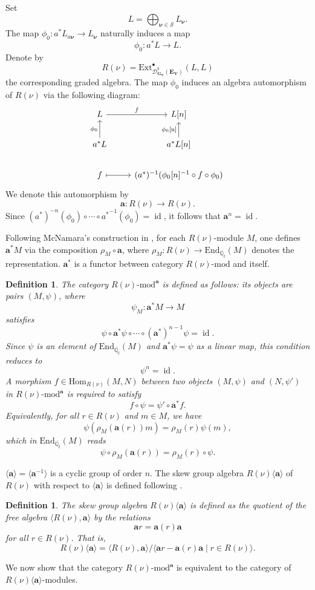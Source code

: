 \documentclass[10pt,a4paper]{amsart}
\newtheorem{definition}[theorem]{Definition}
\newcommand\bbq{{\mathbb Q}}
\begin{document}
Set
\[
L = \bigoplus_{\boldsymbol{\nu}\in \mathcal{S}} L_{\boldsymbol{\nu}}.
\]
The map $\phi_0 : a^* L_{a\boldsymbol{\nu}} \to L_{\boldsymbol{\nu}}$ naturally induces a map
\[
\phi_0 : a^* L \to L.
\]
Denote by
\[
R(\nu) = \mathrm{Ext}^{\bullet}_{\mathcal{D}^{b}_{\mathbf{G}_{\mathbf{V}}}(\mathbf{E}_{\mathbf{V}})}(L, L)
\]
the corresponding graded algebra. The map $\phi_0$ induces an algebra automorphism of $R(\nu)$ via the following diagram:
\[
\begin{tikzcd}
L \arrow[r, "f"] & L[n] \\
a^* L \arrow[u, "\phi_0"] & a^* L[n] \arrow[u, "\phi_0\text{[n]}"] \\
f \arrow[r, maps to] & (a^*)^{-1}(\phi_0[n]^{-1} \circ f \circ \phi_0)
\end{tikzcd}
\]
We denote this automorphism by
\[
\mathbf{a} : R(\nu) \to R(\nu).
\]
Since $(a^*)^{-n}(\phi_0) \circ \cdots \circ {a^*}^{-1}(\phi_0) = \operatorname{id}$, it follows that $\mathbf{a}^n = \operatorname{id}$.

Following McNamara's construction in \cite{https://doi.org/10.1112/jlms.12218}, for each $R(\nu)$-module $M$, one defines
$
\mathbf{a}^* M
$
via the composition $\rho_M \circ \mathbf{a}$, where $\rho_M : R(\nu) \to \mathrm{End}_{\overline{\bbq_l}}(M)$ denotes the representation. $\mathbf{a}^*$ is a functor between category $R(\nu)\text{-}\mathrm{mod}$ and itself. 
\begin{definition}
    The category $R(\nu)\text{-}\mathrm{mod}^\mathbf{a}$ is defined as follows: its objects are pairs $(M, \psi)$, where
\[
\psi_M : \mathbf{a}^* M \to M
\]
satisfies
\[
 \psi \circ \mathbf{a}^* \psi \circ \cdots \circ (\mathbf{a}^*)^{n-1} \psi= \operatorname{id}.
\]
Since $\psi$ is an element of $\mathrm{End}_{\overline{\bbq_l}}(M)$ and $\mathbf{a}^* \psi = \psi$ as a linear map, this condition reduces to
\[
\psi^n = \operatorname{id}.
\]
A morphism $f \in \mathrm{Hom}_{R(\nu)}(M, N)$ between two objects $(M, \psi)$ and $(N, \psi')$ in $R(\nu)\text{-}\mathrm{mod}^\mathbf{a}$ is required to satisfy
\[
f \circ \psi = \psi' \circ \mathbf{a}^* f.
\]
Equivalently, for all $r \in R(\nu)$ and $m \in M$, we have
\[
\psi(\rho_M(\mathbf{a}(r)) m) = \rho_M(r) \psi(m),
\]
which in $\mathrm{End}_{\overline{\bbq_l}}(M)$ reads
\[
\psi \circ \rho_M(\mathbf{a}(r)) = \rho_M(r) \circ \psi.
\]
\end{definition}
$ \langle \mathbf{a} \rangle= \langle \mathbf{a}^{-1} \rangle$ is a cyclic group of order $n.$ The skew group algebra $R(\nu)\langle\mathbf{a}\rangle$ of $R(\nu)$ with respect to $ \langle \mathbf{a} \rangle$ is defined following \cite{REITEN1985224}.
\begin{definition}
The skew group algebra $R(\nu)\langle\mathbf{a}\rangle$ is defined as the quotient of the free algebra $\langle R(\nu), \mathbf{a} \rangle$ by the relations
\[
\mathbf{a} r = \mathbf{a}(r) \mathbf{a}
\]
for all $r \in R(\nu)$. That is,
\[
R(\nu)\langle\mathbf{a}\rangle = \langle R(\nu), \mathbf{a} \rangle \big/ \langle \mathbf{a} r - \mathbf{a}(r) \mathbf{a} \mid r \in R(\nu) \rangle.
\]
\end{definition}
We now show that the category $R(\nu)\text{-}\mathrm{mod}^\mathbf{a}$ is equivalent to the category of $R(\nu)\langle\mathbf{a}\rangle$-modules.
\end{document}
